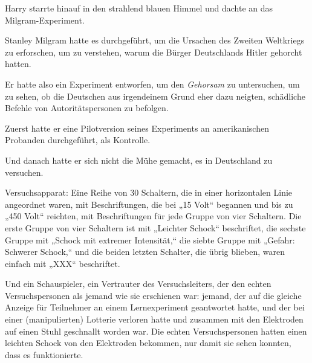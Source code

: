 Harry starrte hinauf in den strahlend blauen Himmel und dachte an das Milgram-Experiment.

Stanley Milgram hatte es durchgeführt, um die Ursachen des Zweiten Weltkriegs zu erforschen, um zu verstehen, warum die Bürger Deutschlands Hitler gehorcht hatten.

Er hatte also ein Experiment entworfen, um den \emph{Gehorsam} zu untersuchen, um zu sehen, ob die Deutschen aus irgendeinem Grund eher dazu neigten, schädliche Befehle von Autoritätspersonen zu befolgen.

Zuerst hatte er eine Pilotversion seines Experiments an amerikanischen Probanden durchgeführt, als Kontrolle.

Und danach hatte er sich nicht die Mühe gemacht, es in Deutschland zu versuchen.

Versuchsapparat: Eine Reihe von 30 Schaltern, die in einer horizontalen Linie angeordnet waren, mit Beschriftungen, die bei „15 Volt“ begannen und bis zu „450 Volt“ reichten, mit Beschriftungen für jede Gruppe von vier Schaltern. Die erste Gruppe von vier Schaltern ist mit „Leichter Schock“ beschriftet, die sechste Gruppe mit „Schock mit extremer Intensität,“ die siebte Gruppe mit „Gefahr: Schwerer Schock,“ und die beiden letzten Schalter, die übrig blieben, waren einfach mit „XXX“ beschriftet.

Und ein Schauspieler, ein Vertrauter des Versuchsleiters, der den echten Versuchspersonen als jemand wie sie erschienen war: jemand, der auf die gleiche Anzeige für Teilnehmer an einem Lernexperiment geantwortet hatte, und der bei einer (manipulierten) Lotterie verloren hatte und zusammen mit den Elektroden auf einen Stuhl geschnallt worden war. Die echten Versuchspersonen hatten einen leichten Schock von den Elektroden bekommen, nur damit sie sehen konnten, dass es funktionierte.

